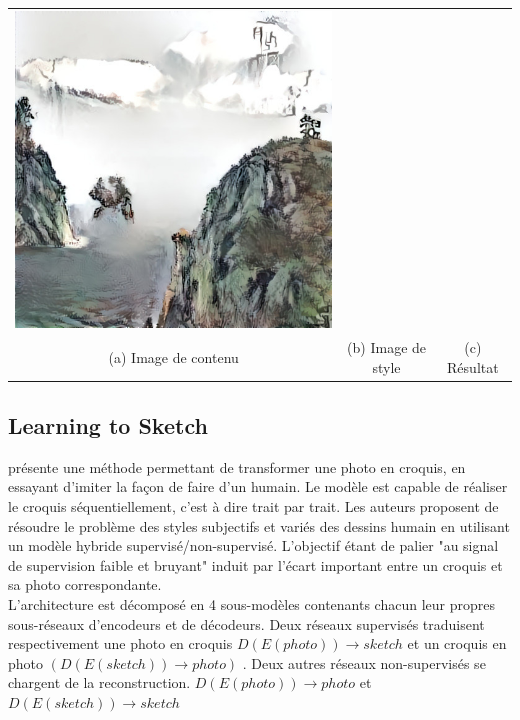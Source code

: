 \documentclass[a4paper, 12pt]{report}
\begin{document}
\begin{center}
\begin{tabular}{ccc}
    \includegraphics[height=0.15\textheight]{images/gaugan-tds.jpg}\\
    (a) Image de contenu & (b) Image de style &(c) Résultat
  \end{tabular}
\end{center}


\subsection{Learning to Sketch} 
\cite{DBLP:journals/corr/abs-1805-00247} présente une méthode permettant de transformer une photo en croquis, en essayant d'imiter la façon de faire d'un humain. Le modèle est capable de réaliser le croquis séquentiellement, c'est à dire trait par trait. Les auteurs proposent de résoudre le problème des styles subjectifs et variés des dessins humain en utilisant un modèle hybride supervisé/non-supervisé. L'objectif étant de palier "au signal de supervision faible et bruyant" induit par l'écart important entre un croquis et sa photo correspondante. \\

L'architecture est décomposé en 4 sous-modèles contenants chacun leur propres sous-réseaux d'encodeurs et de décodeurs. Deux réseaux supervisés traduisent respectivement une photo en croquis $D(E(photo))\to sketch$ et un croquis en photo $(D(E(sketch))\to photo)$ . Deux autres réseaux non-supervisés se chargent de la reconstruction. $D(E(photo))\to photo$ et $D(E(sketch))\to sketch$  \\
\end{document}
